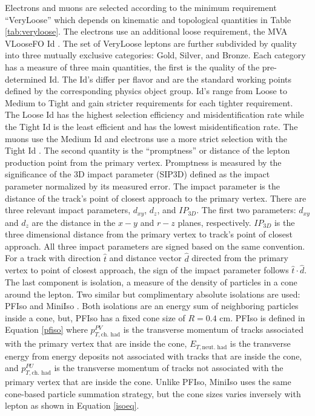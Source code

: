 Electrons and muons are selected according to the minimum requirement ``VeryLoose'' which depends on kinematic and topological quantities in Table \ref{tab:veryloose}. The electrons use an additional loose requirement, the MVA VLooseFO Id \cite{elecMVA}. The set of VeryLoose leptons are further subdivided by quality into three mutually exclusive categories: Gold, Silver, and Bronze. Each category has a measure of three main quantities, the first is the quality of the pre-determined Id. The Id's differ per flavor and are the standard working points defined by the corresponding physics object group.  Id's range from Loose to Medium to Tight and gain stricter requirements for each tighter requirement. The Loose Id has the highest selection efficiency and misidentification rate while the Tight Id is the least efficient and has the lowest misidentification rate. The muons use the Medium Id \cite{muMediumId} and electrons use a more strict selection with the Tight Id \cite{eTightID}. The second quantity is the ``promptness'' or distance of the lepton production point from the primary vertex. Promptness is measured by the significance of the 3D impact parameter (SIP3D) defined as the impact parameter normalized by its measured error. The impact parameter is the distance of the track's point of closest approach to the primary vertex. There are three relevant impact parameters, $d_{xy}$, $d_{z}$, and $IP_{3D}$. The first two parameters: $d_{xy}$ and $d_{z}$ are the distance in the $x-y$ and $r-z$ planes, respectively. $IP_{3D}$ is the three dimensional distance from the primary vertex to track's point of closest approach.  All three impact parameters are signed based on the same convention. For a track with direction $\hat{t}$ and distance vector $\hat{d}$ directed from the primary vertex to point of closest approach, the sign of the impact parameter follows $\hat{t}\cdot\hat{d}$.  The last component is isolation, a measure of the density of particles in a cone around the lepton. Two similar but complimentary absolute isolations are used: PFIso \cite{murun2baseline} and MiniIso \cite{miniIso}. Both isolations are an energy sum of neighboring particles inside a cone, but, PFIso has a fixed cone size of $R=0.4$ cm. PFIso is defined in Equation \ref{pfiso} where $p_{T,\text{ch. had} }^{PV}$ is the transverse momentum of tracks associated with the primary vertex that are inside the cone, $E_{T,\text{neut. had}}$ is the transverse energy from energy deposits not associated with tracks that are inside the cone, and $p_{T, \text{ch. had}}^{PU}$ is the transverse momentum of tracks not associated with the primary vertex that are inside the cone. Unlike PFIso, MiniIso uses the same cone-based particle summation strategy, but the cone sizes varies inversely with lepton \pt as shown in Equation \ref{isoeq}.

